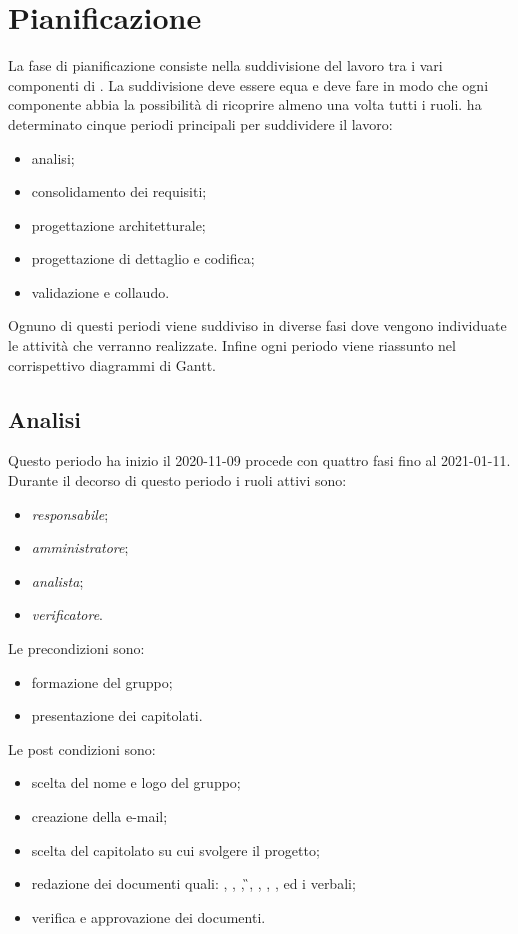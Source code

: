 \section{Pianificazione}
La fase di pianificazione consiste nella suddivisione del lavoro tra i vari componenti di \Gruppo{}. La suddivisione deve essere equa e deve fare in modo che ogni componente abbia la possibilità di ricoprire almeno una volta tutti i ruoli.
\Gruppo{} ha determinato cinque periodi principali per suddividere il lavoro:
\begin{itemize}
\item analisi;
\item consolidamento dei requisiti;
\item progettazione architetturale;
\item progettazione di dettaglio e codifica;
\item validazione e collaudo.
\end{itemize}
Ognuno di questi periodi viene suddiviso in diverse fasi dove vengono individuate le attività che verranno realizzate.
Infine ogni periodo viene riassunto nel corrispettivo diagrammi di Gantt.
\subsection{Analisi}
Questo periodo ha inizio il 2020-11-09 procede con quattro fasi fino al 2021-01-11.
Durante il decorso di questo periodo i ruoli attivi sono:
\begin{itemize}
\item \textit{responsabile};
\item \textit{amministratore};
\item \textit{analista};
\item \textit{verificatore}.
\end{itemize}
Le precondizioni sono:
\begin{itemize}
	\item formazione del gruppo;
	\item presentazione dei capitolati.
\end{itemize}
Le post condizioni sono:
\begin{itemize}
	\item scelta del nome e logo del gruppo;
	\item creazione della e-mail;
	\item scelta del capitolato su cui svolgere il progetto;
	\item redazione dei documenti quali: \SdF{}, \NdP{}, \PdP{}, \G{}, \LdP{}, \PdQ{}, \AdR{}, ed i verbali;
	\item verifica e approvazione dei documenti.
\end{itemize}
